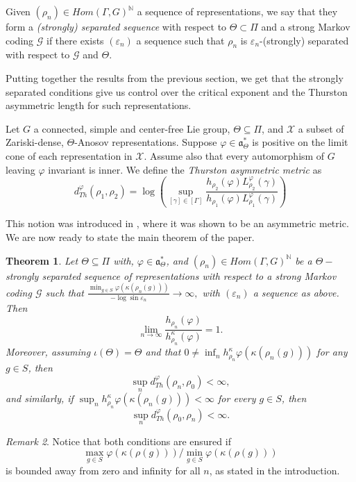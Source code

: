 \documentclass{amsart}
\newtheorem{thm}{Theorem}[section]
\theoremstyle{remark}
\newtheorem{rmk}[thm]{Remark}
\theoremstyle{definition}
\begin{document}
Given $(\rho_n) \in Hom (\Gamma, G)^\mathbb{N}$ a sequence of representations, we say that they form a \emph{(strongly) separated sequence} with respect to $\Theta \subset \Pi$ and a strong Markov coding $\mathcal{G}$ if there exists $(\varepsilon_n)$ a sequence such that $\rho_n$ is $\varepsilon_n$-(strongly) separated with respect to $\mathcal{G}$ and $\Theta$.

Putting together the results from the previous section, we get that the strongly separated conditions give us control over the critical exponent and the Thurston asymmetric length for such representations.

Let $G$ a connected, simple and center-free Lie group, $\Theta \subseteq \Pi$, and $\mathcal{X}$ a subset of Zariski-dense, $\Theta$-Anosov representations.
Suppose $\varphi \in \mathfrak{a}^*_\Theta$ is positive on the limit cone of each representation in $\mathcal{X}$. Assume also that every automorphism of $G$ leaving $\varphi$ invariant is inner. We define the \emph{Thurston asymmetric metric} as 
$$d^\varphi_{Th}(\rho_1, \rho_2) = \log\left(\sup_{[\gamma] \in [\Gamma]}\frac{h_{\rho_2}(\varphi)L^\varphi_{\rho_2}(\gamma)}{h_{\rho_1}(\varphi)L^\varphi_{\rho_1}(\gamma)}\right)$$

This notion was introduced in \cite{carvajales2024thurston}, where it was shown to be an asymmetric metric. We are now ready to state the main theorem of the paper.

\begin{thm}
\label{thm:general+}
Let $\Theta \subseteq \Pi$ with, $\varphi \in \mathfrak{a}_\Theta^*$, and $(\rho_n) \in Hom (\Gamma,G)^\mathbb{N}$ be a $\Theta-$strongly separated sequence of representations with respect to a strong Markov coding $\mathcal{G}$ such that $\frac{\min_{g \in S} \varphi (\kappa (\rho_n (g)))}{ -\log \sin \varepsilon_n} \to \infty,$ with $(\varepsilon_n)$ a sequence as above. 
Then
$$\lim_{n \to \infty} \frac{h_{\rho_n} (\varphi)}{h_{\rho_n}^\kappa (\varphi)} = 1.$$
Moreover, assuming $\iota(\Theta) = \Theta$ and that $0 \neq \inf_n h_{\rho_n}^\kappa \varphi (\kappa (\rho_n (g)))$ for any $g \in S$, then
$$\sup_n d_{Th}^\varphi (\rho_n, \rho_0) <\infty,$$
and similarly, if $\sup_n h_{\rho_n}^\kappa \varphi (\kappa (\rho_n (g))) <\infty$ for every $g \in S$, then
$$\sup_n d_{Th}^\varphi (\rho_0,\rho_n) < \infty.$$
\end{thm}

\begin{rmk}
   Notice that both conditions are ensured if $$\max_{g \in S} \varphi (\kappa (\rho (g)))/ \min_{g \in S} \varphi (\kappa (\rho (g)))$$ is bounded away from zero and infinity for all $n$, as stated in the introduction.
\end{rmk}
\end{document}
